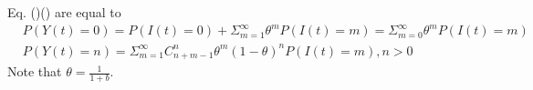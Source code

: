 \documentclass[a4paper,10pt]{article}
\begin{document}
Eq. ()() are equal to
\begin{equation}
	\begin{aligned}
	&P(Y(t)=0)=P(I(t)=0)+\Sigma_{m=1}^\infty\theta^m P(I(t)=m)=\Sigma_{m=0}^\infty\theta^m P(I(t)=m)	\\
	&P(Y(t)=n)=\Sigma_{m=1}^\infty C^n_{n+m-1} \theta^m(1-\theta)^n P(I(t)=m),n>0
	\end{aligned}
\end{equation}
Note that $\theta=\frac{1}{1+b}$.



\end{document}
